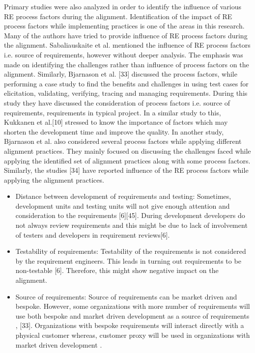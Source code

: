 \documentclass{article}
\begin{document}
Primary studies were also analyzed in order to identify the influence of various RE process factors during the alignment. Identification of the impact of RE process factors while implementing practices is one of the areas in this research. 
Many of the authors have tried to provide influence of RE process factors during the alignment. Sabaliauskaite et al.  mentioned the influence of RE process factors i.e. source of requirements, however without deeper analysis. The emphasis was made on identifying the challenges rather than influence of process factors on the alignment. Similarly, Bjarnason et al. [33] discussed the process factors, while performing a case study to find the benefits and challenges in using test cases for elicitation, validating, verifying, tracing and managing requirements. During this study they have discussed the consideration of process factors i.e. source of requirements, requirements in typical project. In a similar study to this, Kukkanen et al.[10] stressed to know the importance of factors which may shorten the development time and improve the quality. In another study\cite{bjarnason2014challengesS9}, Bjarnason et al. also considered several process factors while applying different alignment practices. They mainly focused on discussing the challenges faced while applying the identified set of alignment practices along with some process factors. Similarly, the studies [34]\cite{wnuk2014delicateS8} have reported influence of the RE process factors while applying the alignment practices. 
\begin{itemize}
    \item Distance between development of requirements and testing: Sometimes, development units and testing units will not give enough attention and consideration to the requirements [6][45]. During development developers do not always review requirements and this might be due to lack of involvement of testers and developers in requirement reviews[6].
    \item Testability of requirements: Testability of the requirements is not considered by the requirement engineers. This leads in turning out requirements to be non-testable [6]. Therefore, this might show negative impact on the alignment. 
    \item	Source of requirements: Source of requirements can be market driven and bespoke. However, some organizations with more number of requirements will use both bespoke and market driven development as a source of requirements \cite{kukkanen2009applyingS2}, [33]. Organizations with bespoke requirements will interact directly with a physical customer whereas, customer proxy will be used in organizations with market driven development \cite{bjarnason2014challengesS9}.  
\end{itemize}
\end{document}
